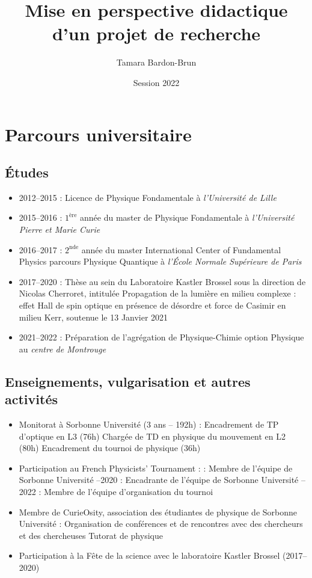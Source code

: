 \documentclass[a4paper,11pt]{article} %
\title{Mise en perspective didactique d'un projet de recherche}
\author{Tamara Bardon-Brun}
\date{Session 2022}
\newcommand{\pointmedian}{{\fontfamily{cmr}\selectfont\textperiodcentered}}
\begin{document}
	\label{key}
	\maketitle
	
	\section{Parcours universitaire}
	\subsection{\'{E}tudes}
	\begin{itemize}
		\item 2012--2015 : Licence de Physique Fondamentale à \textit{l'Université de Lille}
		\item 2015--2016 : $1^\text{ère}$ année du master de Physique Fondamentale à \textit{l'Université Pierre et Marie Curie}
		\item 2016--2017 : $2^\text{nde}$ année du master International Center of Fundamental Physics parcours Physique Quantique à \textit{l'\'{E}cole Normale Supérieure de Paris}
		\item 2017--2020 : Thèse au sein du Laboratoire Kastler Brossel sous la direction de Nicolas Cherroret, intitulée \og Propagation de la lumière en milieu complexe : effet Hall de spin optique en présence de désordre et force de Casimir en milieu Kerr\fg{}, soutenue le 13 Janvier 2021
		\item 2021--2022 : Préparation de l'agrégation de Physique-Chimie option Physique au \textit{centre de Montrouge}
	\end{itemize}
	
	\subsection{Enseignements, vulgarisation et autres activités}
	\begin{itemize}
		\item Monitorat à Sorbonne Université (3 ans -- 192h) :
		\subitem Encadrement de TP d'optique en L3 (76h)
		\subitem Chargée de TD en physique du mouvement en L2 (80h)
		\subitem Encadrement du tournoi de physique (36h)\\
		\item Participation au French Physicists' Tournament :
		 : Membre de l'équipe de Sorbonne Université
		--2020 : Encadrante de l'équipe de Sorbonne Université
		--2022 : Membre de l'équipe d'organisation du tournoi \\
		\item Membre de CurieOsity, association des étudiant\pointmedian{}es de physique de Sorbonne Université :
		\subitem Organisation de conférences et de rencontres avec des chercheurs et des chercheuses
		\subitem Tutorat de physique\\
		\item Participation à la Fête de la science avec le laboratoire Kastler Brossel (2017--2020)
	\end{itemize}
\end{document}
